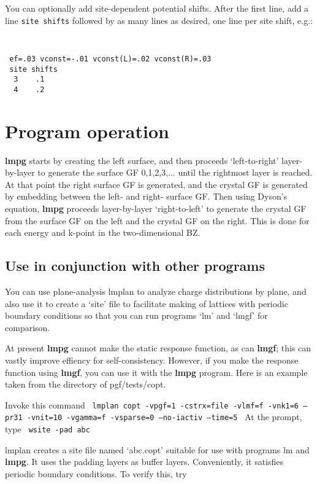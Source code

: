 \documentclass{article}
\begin{document}
You can optionally add site-dependent potential shifts.  After
the first line, add a line {\tt site shifts} followed by as
many lines as desired, one line per site shift, e.g.:

{\tt
\vskip 6pt
\begin{verbatim}
 ef=.03 vconst=-.01 vconst(L)=.02 vconst(R)=.03
 site shifts
  3    .1
  4    .2
\end{verbatim}
\vskip 6pt
}

\section{Program operation}
\label{sec:operation}

{\bf lmpg} starts by creating the left surface, and then proceeds
`left-to-right' layer-by-layer to generate the surface GF 0,1,2,3,...
until the rightmost layer is reached.  At that point the right surface
GF is generated, and the crystal GF is generated by embedding between
the left- and right- surface GF.  Then using Dyson's equation, {\bf lmpg}
proceeds layer-by-layer `right-to-left' to generate the crystal GF
from the surface GF on the left and the crystal GF on the right.
This is done for each energy and k-point in the two-dimensional BZ.

\subsection{Use in conjunction with other programs}

You can use plane-analysis lmplan to analyze charge distributions
by plane, and also use it to create a `site' file to facilitate
making of lattices with periodic boundary conditions so that you
can run programs `lm' and `lmgf' for comparison.

At present {\bf lmpg} cannot make the static response function, as can {\bf lmgf};
this can vastly improve effiency for self-consistency.  However, if
you make the response function using {\bf lmgf}, you can use it with the
{\bf lmpg} program.  Here is an example taken from the directory
of pgf/tests/copt.

\vskip 12pt
\noindent
Invoke this command
{\tt
\vskip 6pt
lmplan copt -vpgf=1 -cstrx=file -vlmf=f -vnk1=6 --pr31 -vnit=10 -vgamma=f -vsparse=0 --no-iactiv --time=5
\vskip 6pt
}
\vskip 12pt
\noindent
At the prompt, type
{\tt
\vskip 6pt
  wsite -pad abc
\vskip 6pt
}

\vskip 12pt
\noindent
lmplan creates a site file named `abc.copt' suitable for use with programs lm
and {\bf lmpg}.  It uses the padding layers as buffer layers.  Conveniently,
it satisfies periodic boundary conditions.  To verify this, try
\end{document}
